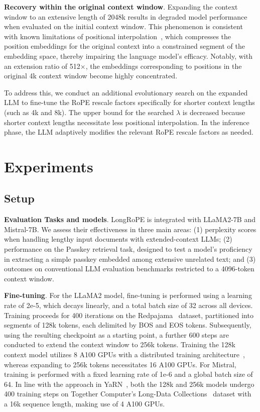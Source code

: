 \textbf{Recovery within the original context window}. Expanding the context window to an extensive length of 2048k results in degraded model performance when evaluated on the initial context window. This phenomenon is consistent with known limitations of positional interpolation~\cite{pi}, which compresses the position embeddings for the original context into a constrained segment of the embedding space, thereby impairing the language model’s efficacy. Notably, with an extension ratio of 512$\times$, the embeddings corresponding to positions in the original 4k context window become highly concentrated.

To address this, we conduct an additional evolutionary search on the expanded LLM to fine-tune the RoPE rescale factors specifically for shorter context lengths (such as 4k and 8k). The upper bound for the searched $\lambda$ is decreased because shorter context lengths necessitate less positional interpolation. In the inference phase, the LLM adaptively modifies the relevant RoPE rescale factors as needed.

 \section{Experiments}

\label{sec:exp}
\subsection{Setup}
\textbf{Evaluation Tasks and models}. LongRoPE is integrated with LLaMA2-7B and Mistral-7B. We assess their effectiveness in three main areas: (1) perplexity scores when handling lengthy input documents with extended-context LLMs; (2) performance on the Passkey retrieval task, designed to test a model’s proficiency in extracting a simple passkey embedded among extensive unrelated text; and (3) outcomes on conventional LLM evaluation benchmarks restricted to a 4096-token context window.

\textbf{Fine-tuning}. For the LLaMA2 model, fine-tuning is performed using a learning rate of 2e-5, which decays linearly, and a total batch size of 32 across all devices. Training proceeds for 400 iterations on the Redpajama~\cite{redpajama} dataset, partitioned into segments of 128k tokens, each delimited by BOS and EOS tokens. Subsequently, using the resulting checkpoint as a starting point, a further 600 steps are conducted to extend the context window to 256k tokens. Training the 128k context model utilizes 8 A100 GPUs with a distributed training architecture~\cite{cube}, whereas expanding to 256k tokens necessitates 16 A100 GPUs. For Mistral, training is performed with a fixed learning rate of 1e-6 and a global batch size of 64. In line with the approach in YaRN~\cite{yarn}, both the 128k and 256k models undergo 400 training steps on Together Computer’s Long-Data Collections~\cite{mistraldata} dataset with a 16k sequence length, making use of 4 A100 GPUs.

